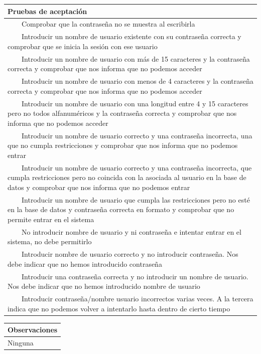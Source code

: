 \documentclass[11pt]{article}
\newcommand{\tabitem}{~~\llap{\textbullet}~~}
\begin{document}
  \begin{longtable}{p{1.028\linewidth}}
    \textbf{Pruebas de aceptación}\\
  \midrule
  \tabitem Comprobar que la contraseña no se muestra al escribirla\\
  \tabitem Introducir un nombre de usuario existente con su contraseña correcta y comprobar que se inicia la sesión con ese usuario\\
  \tabitem Introducir un nombre de usuario con más de 15 caracteres y la contraseña correcta y comprobar que nos informa que no podemos acceder\\
  \tabitem Introducir un nombre de usuario con menos de 4 caracteres y la contraseña correcta y comprobar que nos informa que no podemos acceder\\
  \tabitem Introducir un nombre de usuario con una longitud entre 4 y 15 caracteres pero no todos alfanuméricos y la contraseña correcta y comprobar que nos informa que no podemos acceder\\
  \tabitem Introducir un nombre de usuario correcto y una contraseña incorrecta, una que no cumpla restricciones y comprobar que nos informa que no podemos entrar\\
  \tabitem Introducir un nombre de usuario correcto y una contraseña incorrecta, que cumpla restricciones pero no coincida con la asociada al usuario en la base de datos y comprobar que nos informa que no podemos entrar\\
  \tabitem Introducir un nombre de usuario que cumpla las restricciones pero no esté en la base de datos y contraseña correcta en formato y comprobar que no permite entrar en el sistema\\
  \tabitem No introducir nombre de usuario y ni contraseña e intentar entrar en el sistema, no debe permitirlo\\
  \tabitem Introducir nombre de usuario correcto y no introducir contraseña. Nos debe indicar que no hemos introducido contraseña\\
  \tabitem Introducir una contraseña correcta y no introducir un nombre de usuario. Nos debe indicar que no hemos introducido nombre de usuario\\
  \tabitem Introducir contraseña/nombre usuario incorrectos varias veces. A la tercera indica que no podemos volver a intentarlo hasta dentro de cierto tiempo\\
\end{longtable}
\begin{longtable}{p{1.028\linewidth}}
  \textbf{Observaciones}\\
  \midrule
   Ninguna\\
  \bottomrule
  \bottomrule
\end{longtable}
\end{document}
